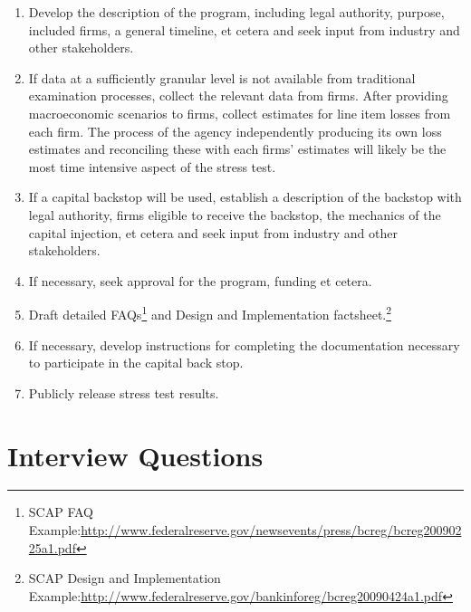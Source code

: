 \documentclass[12pt]{article}
\begin{document}
\begin{enumerate}

\item Develop the description of the program, including legal authority, purpose, included firms, a general timeline, et cetera and seek input from industry and other stakeholders.
\item If data at a sufficiently granular level is not available from traditional examination processes, collect the relevant data from firms. After providing macroeconomic scenarios to firms, collect estimates for line item losses from each firm. The process of the agency independently producing its own loss estimates and reconciling these with each firms' estimates will likely be the most time intensive aspect of the stress test.
\item If a capital backstop will be used, establish a description of the backstop with legal authority, firms eligible to receive the backstop, the mechanics of the capital injection, et cetera and seek input from industry and other stakeholders.
\item If necessary, seek approval for the program, funding et cetera.
\item Draft detailed FAQs\footnote{SCAP FAQ Example:\url{http://www.federalreserve.gov/newsevents/press/bcreg/bcreg20090225a1.pdf}} and Design and Implementation factsheet.\footnote{SCAP Design and Implementation Example:\url{http://www.federalreserve.gov/bankinforeg/bcreg20090424a1.pdf}}
\item If necessary, develop instructions for completing the documentation necessary to participate in the capital back stop.
\item Publicly release stress test results.

\end{enumerate}

\section{Interview Questions}
\end{document}
